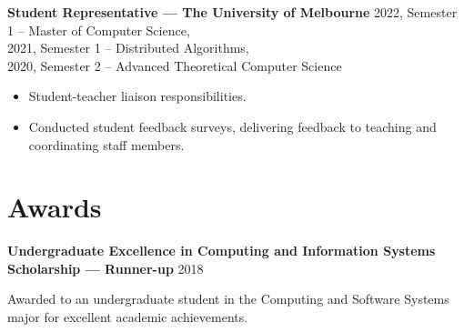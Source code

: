 \documentclass[9pt]{extarticle}
\newcommand{\entry}[3]{
    \textbf{#1} \newline
    {\footnotesize #2}
    \vspace{.05em}
    \begin{flushleft}
        #3
    \end{flushleft}
}
\begin{document}
\entry{Student Representative --- The University of Melbourne}
{
    2022, Semester 1 -- Master of Computer Science, \\
    2021, Semester 1 -- Distributed Algorithms, \\
    2020, Semester 2 -- Advanced Theoretical Computer Science
}
{
    \begin{itemize}
        \item Student-teacher liaison responsibilities.
        \item Conducted student feedback surveys, delivering feedback to teaching and coordinating staff members.
    \end{itemize}
}

\medskip

\section{Awards}

\entry{Undergraduate Excellence in Computing and Information Systems Scholarship --- Runner-up}
{2018} 
{
    Awarded to an undergraduate student in the Computing and Software Systems major for excellent academic achievements.
}
\end{document}
